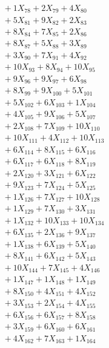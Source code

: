 \documentclass[a4paper,10pt]{article}
\begin{document}
{\begin{align}
&\;  + 1 X_{78} + 2 X_{79} + 4 X_{80} \\[0.3ex]
&\;  + 5 X_{81} + 9 X_{82} + 2 X_{83} \\[0.3ex]
&\;  + 8 X_{84} + 7 X_{85} + 2 X_{86} \\[0.3ex]
&\;  + 8 X_{87} + 5 X_{88} + 3 X_{89} \\[0.3ex]
&\;  + 3 X_{90} + 7 X_{91} + 4 X_{92} \\[0.3ex]
&\;  + 10 X_{93} + 8 X_{94} + 10 X_{95} \\[0.3ex]
&\;  + 9 X_{96} + 9 X_{97} + 6 X_{98} \\[0.3ex]
&\;  + 8 X_{99} + 9 X_{100} + 5 X_{101} \\[0.3ex]
&\;  + 5 X_{102} + 6 X_{103} + 1 X_{104} \\[0.3ex]
&\;  + 4 X_{105} + 9 X_{106} + 5 X_{107} \\[0.5ex]\allowbreak
&\;  + 2 X_{108} + 7 X_{109} + 10 X_{110} \\[0.3ex]
&\;  + 10 X_{111} + 4 X_{112} + 10 X_{113} \\[0.3ex]
&\;  + 6 X_{114} + 8 X_{115} + 6 X_{116} \\[0.3ex]
&\;  + 6 X_{117} + 6 X_{118} + 8 X_{119} \\[0.3ex]
&\;  + 2 X_{120} + 3 X_{121} + 6 X_{122} \\[0.3ex]
&\;  + 9 X_{123} + 7 X_{124} + 5 X_{125} \\[0.3ex]
&\;  + 1 X_{126} + 7 X_{127} + 10 X_{128} \\[0.3ex]
&\;  + 1 X_{129} + 7 X_{130} + 3 X_{131} \\[0.3ex]
&\;  + 1 X_{132} + 10 X_{133} + 10 X_{134} \\[0.3ex]
&\;  + 6 X_{135} + 2 X_{136} + 9 X_{137} \\[0.5ex]\allowbreak
&\;  + 1 X_{138} + 6 X_{139} + 5 X_{140} \\[0.3ex]
&\;  + 8 X_{141} + 6 X_{142} + 5 X_{143} \\[0.3ex]
&\;  + 10 X_{144} + 7 X_{145} + 4 X_{146} \\[0.3ex]
&\;  + 1 X_{147} + 1 X_{148} + 1 X_{149} \\[0.3ex]
&\;  + 8 X_{150} + 4 X_{151} + 4 X_{152} \\[0.3ex]
&\;  + 3 X_{153} + 2 X_{154} + 4 X_{155} \\[0.3ex]
&\;  + 6 X_{156} + 6 X_{157} + 8 X_{158} \\[0.3ex]
&\;  + 3 X_{159} + 6 X_{160} + 6 X_{161} \\[0.3ex]
&\;  + 4 X_{162} + 7 X_{163} + 1 X_{164} \\[0.3ex]

\end{align}}
\end{document}
